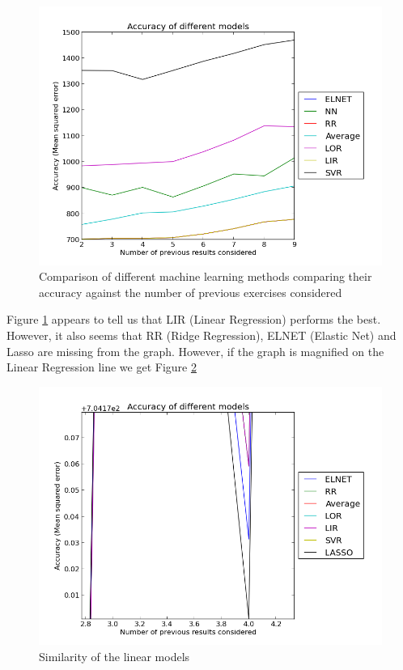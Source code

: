 \begin{figure}[p]
\centering
\includegraphics[width=1\textwidth]{kfoldall.png}
\caption{Comparison of different machine learning methods comparing their accuracy against the number of previous exercises considered}
\label{fig:kfoldall}
\end{figure}

Figure \ref{fig:kfoldall} appears to tell us that LIR (Linear Regression) performs the best. However, it also seems that RR (Ridge Regression), ELNET (Elastic Net) and Lasso are missing from the graph. However, if the graph is magnified on the Linear Regression line we get Figure \ref{fig:zoomed}

\begin{figure}[p]
\centering
\includegraphics[width=1\textwidth]{linearmodels.png}
\caption{Similarity of the linear models}
\label{fig:zoomed}
\end{figure}

